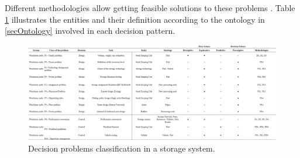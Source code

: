Different methodologies allow getting feasible solutions to these problems \cite{Cormier1992, Gray1992, Manzini2015, VandenBerg1999a}. Table \ref{tab_problems_wh} illustrates the entities and their definition according to the ontology in \ref{secOntology} involved in each decision pattern. 


\begin{landscape}
\thispagestyle{empty}
\begin{figure}[hbt!]
\centering
\includegraphics[width=1.5\textwidth]{SectionWarehouses/diagnsticModels_figures/tab_problems_wh.png}
\captionsetup{type=table}
\caption{Decision problems classification in a storage system.}
\label{tab_problems_wh}
\end{figure}
\end{landscape}


